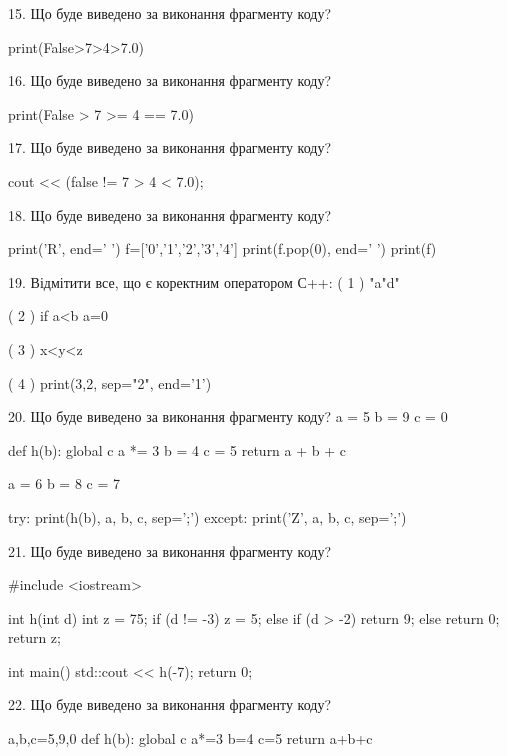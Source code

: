 \documentclass[11pt]{article}
\begin{document}

15. Що буде виведено за виконання фрагменту коду?

print(False>7>4>7.0)


16. Що буде виведено за виконання фрагменту коду?

print(False > 7 >= 4 == 7.0)


17. Що буде виведено за виконання фрагменту коду?

cout << (false != 7 > 4 < 7.0);


18. Що буде виведено за виконання фрагменту коду?

print('R', end=' ')
f=['0','1','2','3','4']
print(f.pop(0), end=' ')
print(f)



19. %
Відмітити все, що є коректним оператором С++:
( 1 ) "a"d"

( 2 ) if a<b a=0

( 3 ) x<y<z

( 4 ) print(3,2, sep="2", end='1')


20. Що буде виведено за виконання фрагменту коду?
a = 5
b = 9
c = 0

def h(b):
global c    a *= 3
    b = 4
    c = 5
    return a + b + c

a = 6
b = 8
c = 7

try:
    print(h(b), a, b, c, sep=';')
except:
    print('Z', a, b, c, sep=';')


21. Що буде виведено за виконання фрагменту коду?

#include <iostream>

int h(int d){
    int z = 75;
    if (d != -3) 
        z = 5;
    else if (d > -2)
         return 9;
    else
         return 0;
    return z;
}

int main(){
    std::cout << h(-7);
    return 0;
}



22. Що буде виведено за виконання фрагменту коду?

a,b,c=5,9,0
def h(b):
global c    a*=3
    b=4
    c=5
    return a+b+c
\end{document}
